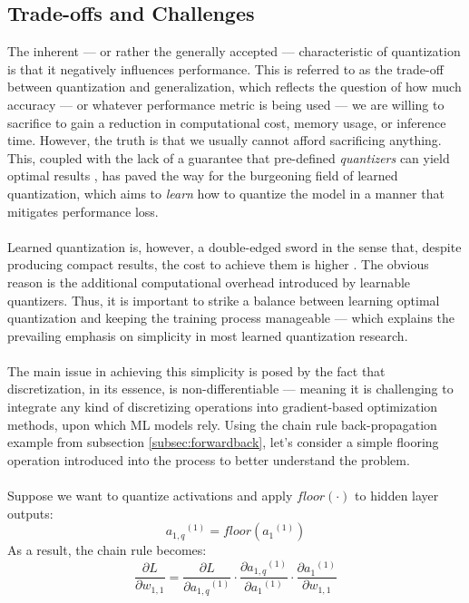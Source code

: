 
\subsection{Trade-offs and Challenges}
\label{subsec:subsection1}
The inherent — or rather the generally accepted — characteristic of quantization is
that it negatively influences performance. 
This is referred to as the trade-off between quantization and generalization, 
which reflects the question of how much accuracy — or whatever performance metric is being used — 
we are willing to sacrifice to gain a reduction in computational cost, memory usage, or inference time.
However, the truth is that we usually cannot afford sacrificing anything.  This, coupled with the lack of a guarantee
 that pre-defined \textit{quantizers} can yield optimal results \cite{DBLP:conf/eccv/ZhangYYH18} \cite{DBLP:conf/iclr/EsserMBAM20}, 
 has paved the way for the burgeoning field of learned quantization,
 which aims to \textit{learn} how to quantize the model in a manner that mitigates performance loss.
\\
\\
Learned quantization is, however, a double-edged sword in the sense that, despite producing compact results,
the cost to achieve them is higher \cite{DBLP:conf/eccv/ParkYV18}. The obvious reason is the additional computational overhead
introduced by learnable quantizers.
Thus, it is important to strike a balance between learning optimal quantization and keeping the training process manageable
— which explains the prevailing emphasis on simplicity in most learned quantization research.
\\
\\
The main issue in achieving this simplicity is posed by the fact that discretization, in its essence, is non-differentiable
 — meaning it is challenging to integrate any kind of discretizing operations into gradient-based optimization methods, 
 upon which ML models rely. Using the chain rule back-propagation example from subsection \ref{subsec:forwardback}, let's
consider a simple flooring operation introduced into the process to better understand the problem.
\\
\\
Suppose we want to quantize activations and apply \( floor(\cdot) \) to hidden layer outputs:
\[
  {a_{1,q}}^{(1)} =  floor({a_1}^{(1)})
  \]
As a result, the chain rule becomes:
 \[
  \frac{\partial L}{\partial w_{1,1}} =  \frac{\partial L}{\partial {a_{1,q}}^{(1)}} 
  \cdot \frac{\partial {a_{1,q}}^{(1)}}{\partial {a_1}^{(1)}} 
  \cdot \frac{\partial {a_1}^{(1)}}{\partial w_{1,1}}
  \]
  
